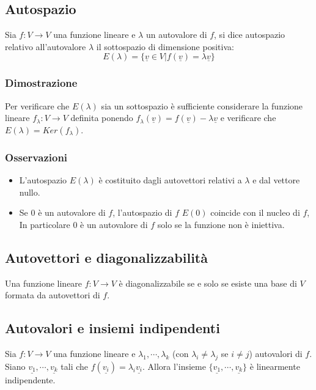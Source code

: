 \subsection{Autospazio}
Sia $f:V\rightarrow V$ una funzione lineare e $\lambda$ un autovalore di $f$, si dice autospazio relativo all'autovalore $\lambda$ il sottospazio di dimensione positiva:
\begin{equation}
E(\lambda)=\{\underline{v}\in V|f(\underline{v})=\lambda\underline{v}\}
\end{equation}
\subsubsection{Dimostrazione}
Per verificare che $E(\lambda)$ sia un sottospazio \`e sufficiente considerare la funzione lineare $f_\lambda:V\rightarrow V$ definita ponendo $f_\lambda (\underline{v})=
f(\underline{v})-\lambda\underline{v}$ e verificare che $E(\lambda)=Ker(f_\lambda)$.
\subsubsection{Osservazioni}
\begin{itemize}
\item L'autospazio $E(\lambda)$ \`e costituito dagli autovettori relativi a $\lambda$ e dal vettore nullo.
\item Se $0$ \`e un autovalore di $f$, l'autospazio di $f$ $E(0)$ coincide con il nucleo di $f$, In particolare $0$ \`e un autovalore di $f$ solo se la funzione non \`e 
iniettiva.
\end{itemize}
\subsection{Autovettori e diagonalizzabilit\`a}
Una funzione lineare $f:V\rightarrow V$ \`e diagonalizzabile se e solo se esiste una base di $V$ formata da autovettori di $f$.
\subsection{Autovalori e insiemi indipendenti}
Sia $f:V\rightarrow V$ una funzione lineare e $\lambda_1,\cdots,\lambda_k$ (con $\lambda_i\neq\lambda_j$ se $i\neq j$) autovalori di $f$. Siano $\underline{v_1},\cdots,
\underline{v_k}$ tali che $f(\underline{v_i})=\lambda_i\underline{v_i}$. Allora l'insieme $\{\underline{v_1},\cdots,\underline{v_k}\}$ \`e linearmente indipendente.
